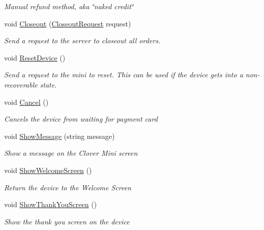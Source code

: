 \begin{DoxyCompactItemize}
\begin{DoxyCompactList}\small\item\em Manual refund method, aka \char`\"{}naked credit\char`\"{} \end{DoxyCompactList}\item 
void \hyperlink{classcom_1_1clover_1_1remotepay_1_1sdk_1_1_clover_connector_aa8348f5f0769ad3023858d310e5aa847}{Closeout} (\hyperlink{classcom_1_1clover_1_1remotepay_1_1sdk_1_1_closeout_request}{Closeout\+Request} request)
\begin{DoxyCompactList}\small\item\em Send a request to the server to closeout all orders. \end{DoxyCompactList}\item 
void \hyperlink{classcom_1_1clover_1_1remotepay_1_1sdk_1_1_clover_connector_a422575429ff010ed302c57eb5542c35f}{Reset\+Device} ()
\begin{DoxyCompactList}\small\item\em Send a request to the mini to reset. This can be used if the device gets into a non-\/recoverable state. \end{DoxyCompactList}\item 
void \hyperlink{classcom_1_1clover_1_1remotepay_1_1sdk_1_1_clover_connector_a6ca6015f34bf85df7d4242add5751606}{Cancel} ()
\begin{DoxyCompactList}\small\item\em Cancels the device from waiting for payment card \end{DoxyCompactList}\item 
void \hyperlink{classcom_1_1clover_1_1remotepay_1_1sdk_1_1_clover_connector_a6efd4dc87eaf16f949b9aeb93e7af464}{Show\+Message} (string message)
\begin{DoxyCompactList}\small\item\em Show a message on the Clover Mini screen \end{DoxyCompactList}\item 
void \hyperlink{classcom_1_1clover_1_1remotepay_1_1sdk_1_1_clover_connector_a33c344737b54ed6d8c910e2ac1e5bd49}{Show\+Welcome\+Screen} ()
\begin{DoxyCompactList}\small\item\em Return the device to the Welcome Screen \end{DoxyCompactList}\item 
void \hyperlink{classcom_1_1clover_1_1remotepay_1_1sdk_1_1_clover_connector_a14b5524c67d9b52c57cd2e972a65d7f1}{Show\+Thank\+You\+Screen} ()
\begin{DoxyCompactList}\small\item\em Show the thank you screen on the device \end{DoxyCompactList}\item 

\end{DoxyCompactItemize}
